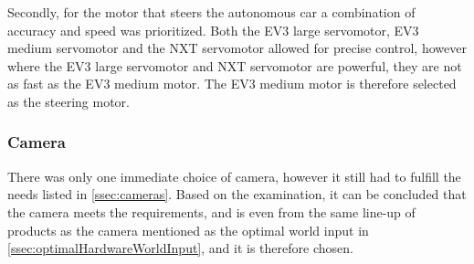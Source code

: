 Secondly, for the motor that steers the autonomous car a combination of accuracy and speed was prioritized.
Both the EV3 large servomotor, EV3 medium servomotor and the NXT servomotor allowed for precise control, however where the EV3 large servomotor and NXT servomotor are powerful, they are not as fast as the EV3 medium motor.
The EV3 medium motor is therefore selected as the steering motor.

\subsubsection{Camera}
There was only one immediate choice of camera, however it still had to fulfill the needs listed in \autoref{ssec:cameras}.
Based on the examination, it can be concluded that the camera meets the requirements, and is even from the same line-up of products as the camera mentioned as the optimal world input in \autoref{ssec:optimalHardwareWorldInput}, and it is therefore chosen.
